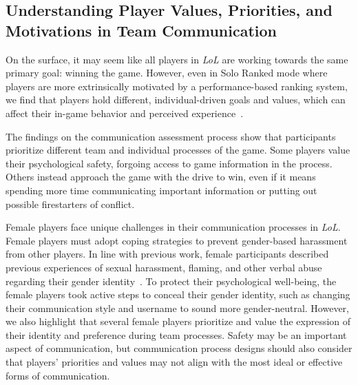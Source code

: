\subsection{Understanding Player Values, Priorities, and Motivations in Team Communication}

On the surface, it may seem like all players in \textit{LoL} are working towards the same primary goal: winning the game. However, even in Solo Ranked mode where players are more extrinsically motivated by a performance-based ranking system, we find that players hold different, individual-driven goals and values, which can affect their in-game behavior and perceived experience~\cite{bruhlmann2020motivational}.

The findings on the communication assessment process show that participants prioritize different team and individual processes of the game. Some players value their psychological safety, forgoing access to game information in the process. Others instead approach the game with the drive to win, even if it means spending more time communicating important information or putting out possible firestarters of conflict.

Female players face unique challenges in their communication processes in \textit{LoL}. Female players must adopt coping strategies to prevent gender-based harassment from other players. In line with previous work, female participants described previous experiences of sexual harassment, flaming, and other verbal abuse regarding their gender identity~\cite{fox2016women, norris2004gender, mclean2019female}. To protect their psychological well-being, the female players took active steps to conceal their gender identity, such as changing their communication style and username to sound more gender-neutral. However, we also highlight that several female players prioritize and value the expression of their identity and preference during team processes. Safety may be an important aspect of communication, but communication process designs should also consider that players' priorities and values may not align with the most ideal or effective forms of communication.

